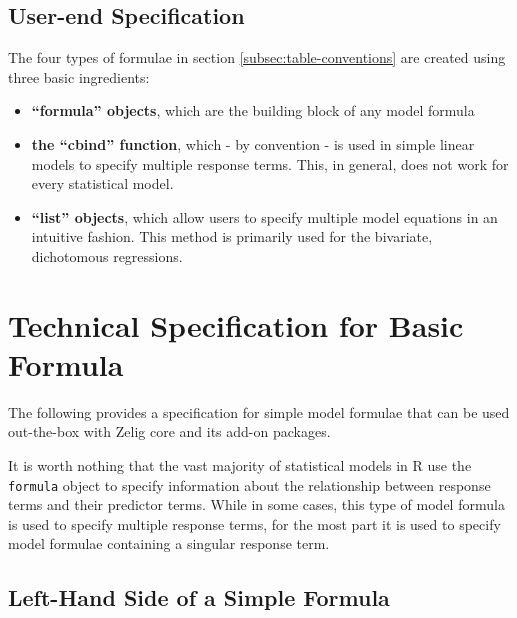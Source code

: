 \documentclass{article}
\begin{document}
\subsection{User-end Specification}
\label{subsec:user-spec-formula}

The four types of formulae in section \ref{subsec:table-conventions} are created
using three basic ingredients:

\begin{itemize}

  \item {\bf ``formula'' objects}, which are the building block of any model
    formula

  \item {\bf the ``cbind'' function}, which - by convention - is used in simple
    linear models to specify multiple response terms. This, in general, does not
    work for every statistical model.

  \item {\bf ``list'' objects}, which allow users to specify multiple
    model equations in an intuitive fashion. This method is primarily used for
    the bivariate, dichotomous regressions.

\end{itemize}


\pagebreak


%
%
%
\section{Technical Specification for Basic Formula}

The following provides a specification for simple model formulae that can be
used out-the-box with Zelig core and its add-on packages.

It is worth nothing that the vast majority of statistical models in R use the
\verb|formula| object to specify information about the relationship between
response terms and their predictor terms. While in some cases, this type of
model formula is used to specify multiple response terms, for the most part
it is used to specify model formulae containing a singular response term.


\subsection{Left-Hand Side of a Simple Formula}
\label{subsec:lhs}
\end{document}
